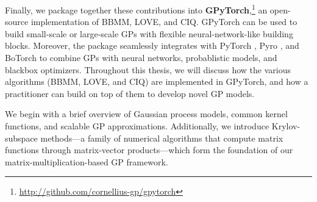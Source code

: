 %
\noindent
Finally, we package together these contributions into {\bf GPyTorch},\footnote{
  \url{http://github.com/cornellius-gp/gpytorch}
}
an open-source implementation of BBMM, LOVE, and CIQ.
GPyTorch can be used to build small-scale or large-scale GPs with flexible neural-network-like building blocks.
Moreover, the package seamlessly integrates with PyTorch \cite{paszke2019pytorch}, Pyro \cite{bingham2019pyro}, and BoTorch \cite{balandat2019botorch} to combine GPs with neural networks, probablistic models, and blackbox optimizers.
Throughout this thesis, we will discuss how the various algorithms (BBMM, LOVE, and CIQ) are implemented in GPyTorch, and how a practitioner can build on top of them to develop novel GP models.

We begin with a brief overview of Gaussian process models, common kernel functions, and scalable GP approximations.
Additionally, we introduce Krylov-subspace methods---a family of numerical algorithms that compute matrix functions through matrix-vector products---which form the foundation of our matrix-multiplication-based GP framework.
